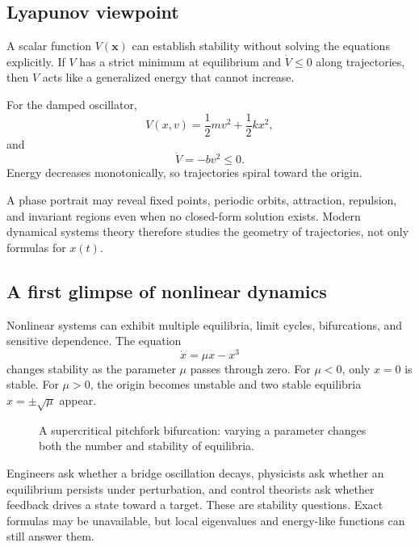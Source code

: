 \subsection{Lyapunov viewpoint}
A scalar function $V(\mathbf{x})$ can establish stability without solving the equations explicitly. If $V$ has a strict minimum at equilibrium and $\dot V\le0$ along trajectories, then $V$ acts like a generalized energy that cannot increase.

For the damped oscillator,
\[
V(x,v)=\frac12mv^2+\frac12kx^2,
\]
and
\[
\dot V=-bv^2\le0.
\]
Energy decreases monotonically, so trajectories spiral toward the origin.

\begin{keyidea}
A phase portrait may reveal fixed points, periodic orbits, attraction, repulsion, and invariant regions even when no closed-form solution exists. Modern dynamical systems theory therefore studies the geometry of trajectories, not only formulas for $x(t)$.
\end{keyidea}

\subsection{A first glimpse of nonlinear dynamics}
Nonlinear systems can exhibit multiple equilibria, limit cycles, bifurcations, and sensitive dependence. The equation
\[
\dot x=\mu x-x^3
\]
changes stability as the parameter $\mu$ passes through zero. For $\mu<0$, only $x=0$ is stable. For $\mu>0$, the origin becomes unstable and two stable equilibria $x=\pm\sqrt{\mu}$ appear.

\begin{figure}[htbp]
\centering

\caption{A supercritical pitchfork bifurcation: varying a parameter changes both the number and stability of equilibria.}
\label{fig:ch4-pitchfork}
\end{figure}

\begin{physicalbox}
Engineers ask whether a bridge oscillation decays, physicists ask whether an equilibrium persists under perturbation, and control theorists ask whether feedback drives a state toward a target. These are stability questions. Exact formulas may be unavailable, but local eigenvalues and energy-like functions can still answer them.
\end{physicalbox}
